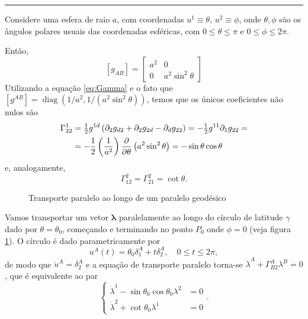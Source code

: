 \noindent
\rule{\textwidth}{0.4pt}
\begin{exemplo}

Considere uma esfera de raio $a$, com coordenadas $u^1\equiv \theta,\, u^2\equiv\phi$, onde $\theta,\phi$ são os ângulos polares usuais das coordenadas esféricas, com $0\leq\theta\leq\pi$ e $0\leq\phi\leq 2\pi$.

Então, 
\[
\left[g_{A B}\right]=\left[\begin{array}{cc}{a^{2}} & {0} \\ {0} & {a^{2} \sin ^{2} \theta}\end{array}\right]
\]
Utilizando a equação \eqref{eq:Gamma} e o fato que $[g^{AB}] = \operatorname{diag}(1/a^2, 1/(a^2\sin^2\theta))$, temos que os únicos coeficientes não nulos são
\begin{align*}
\Gamma_{22}^{1}&= \tfrac{1}{2}g^{1d}\left( \partial_2g_{d2}+\partial_2g_{2d}-\partial_d g_{22} \right) =-\tfrac{1}{2}g^{11}\partial_1g_{22}=\\
&=-\frac{1}{2}\left( \frac{1}{a^2} \right)\pdv{\theta} \left( a^2\sin^2\theta \right) =-\sin \theta \cos \theta
\end{align*}	
e, analogamente,
\[\Gamma_{12}^{2}=\Gamma_{21}^{2}=\cot \theta .\]

\begin{figure}[t]
	\centering
	\caption{Transporte paralelo ao longo de um paralelo geodésico}
	\label{fig:EsferaTransporteParalelo}
\end{figure}


Vamos transportar um vetor $\boldsymbol{\lambda}$ paralelamente ao longo do círculo de latitude $\gamma$ dado por $\theta=\theta_0$, começando e terminando no ponto $P_0$ onde $\phi=0$ (veja figura \ref{fig:EsferaTransporteParalelo}). O círculo é dado parametricamente por
\[u^{A}(t)=\theta_{0} \delta_{1}^{A}+t \delta_{2}^{A}, \quad 0 \leq t \leq 2 \pi,\]
de modo que $\dot{u}^{A}=\delta_{2}^{A}$ e a equação de transporte paralelo torna-se $\dot{\lambda}^{A}+\Gamma_{B 2}^{A} \lambda^{B}=0$, que é equivalente ao par
\begin{equation}\label{eq:EquacoesTransporteLambda}
\left\{\begin{aligned} \dot{\lambda}^{1}-\sin \theta_{0} \cos \theta_{0} \lambda^{2} &=0 \\ \dot{\lambda}^{2}+\cot \theta_{0} \lambda^{1} &=0 \end{aligned}\right. .
\end{equation}


\end{exemplo}
